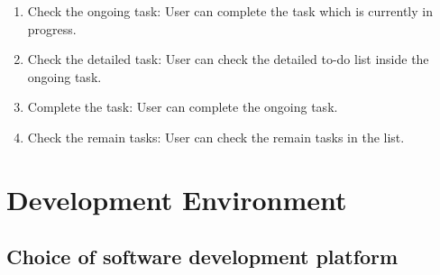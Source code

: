 \documentclass[conference]{IEEEtran}
\begin{document}
\begin{enumerate}
    \item Check the ongoing task: User can complete the task which is currently in progress. \\
    \item Check the detailed task: User can check the detailed to-do list inside the ongoing task. \\
    \item Complete the task: User can complete the ongoing task. \\
    \item Check the remain tasks: User can check the remain tasks in the list.\\

\end{enumerate}

\section{Development Environment}


\subsection{Choice of software development platform}
\end{document}
